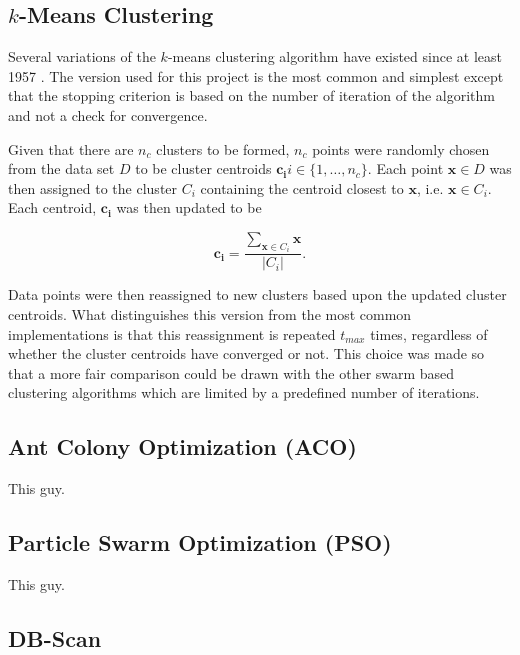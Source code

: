 \documentclass[conference]{IEEEtran}
\begin{document}
  \subsection{$k$-Means Clustering}
  Several variations of the $k$-means clustering algorithm have existed since at least 1957 \cite{steinhaus}. The version used for this project is the most common and simplest except that the stopping criterion is based on the number of iteration of the algorithm and not a check for convergence.

  Given that there are $n_c$ clusters to be formed, $n_c$ points were randomly chosen from the data set $D$ to be cluster centroids $\mathbf{c_i} i \in \{1, \ldots, n_c \} $. Each point $\mathbf{x} \in D$ was then assigned to the cluster $C_i$ containing the centroid closest to $\mathbf{x}$, i.e. $\mathbf{x} \in C_i$. Each centroid, $\mathbf{c_i}$ was then updated to be

  $$\mathbf{c_i} = \frac{\sum_{\mathbf{x} \in C_i} \mathbf{x}}{|C_i|}. $$

  Data points were then reassigned to new clusters based upon the updated cluster centroids. What distinguishes this version from the most common implementations is that this reassignment is repeated $t_{max}$ times, regardless of whether the cluster centroids have converged or not. This choice was made so that a more fair comparison could be drawn with the other swarm based clustering algorithms which are limited by a predefined number of iterations.
  

  \subsection{Ant Colony Optimization (ACO)}
  This guy.\cite{runkler}    

  \subsection{Particle Swarm Optimization (PSO)}
  This guy.\cite{merwe}

  \subsection{DB-Scan}
\end{document}
